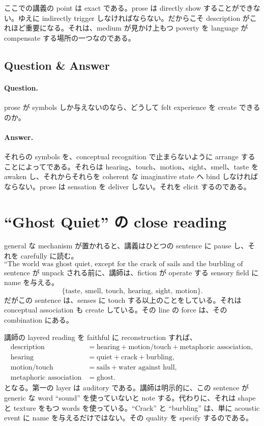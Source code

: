 ここでの講義の point は exact である。prose は directly show することができない。ゆえに indirectly trigger しなければならない。だからこそ description がこれほど重要になる。それは、medium が見かけ上もつ poverty を language が compensate する場所の一つなのである。

\subsection{Question \& Answer}

\paragraph{Question.} prose が symbols しか与えないのなら、どうして felt experience を create できるのか。

\paragraph{Answer.} それらの symbols を、conceptual recognition で止まらないように arrange することによってである。それらは hearing、touch、motion、sight、smell、taste を awaken し、それからそれらを coherent な imaginative state へ bind しなければならない。prose は sensation を deliver しない。それを elicit するのである。

\section{``Ghost Quiet'' の close reading}

general な mechanism が置かれると、講義はひとつの sentence に pause し、それを carefully に読む。
\[
\text{``The world was ghost quiet, except for the crack of sails and the burbling of water against hull.''}
\]
sentence が unpack される前に、講師は、fiction が operate する sensory field に name を与える。
\begin{equation}
\{\text{taste},\ \text{smell},\ \text{touch},\ \text{hearing},\ \text{sight},\ \text{motion}\}.
\end{equation}
だがこの sentence は、senses に touch する以上のことをしている。それは conceptual association も create している。その line の force は、その combination にある。

講師の layered reading を faithful に reconstruction すれば、
\begin{align}
\text{description} &= \text{hearing} + \text{motion/touch} + \text{metaphoric association},\\
\text{hearing} &= \text{quiet} + \text{crack} + \text{burbling},\\
\text{motion/touch} &= \text{sails} + \text{water against hull},\\
\text{metaphoric association} &= \text{ghost}.
\end{align}
となる。第一の layer は auditory である。講師は明示的に、この sentence が generic な word ``sound'' を使っていないと note する。代わりに、それは shape と texture をもつ words を使っている。``Crack'' と ``burbling'' は、単に acoustic event に name を与えるだけではない。その quality を specify するのである。


